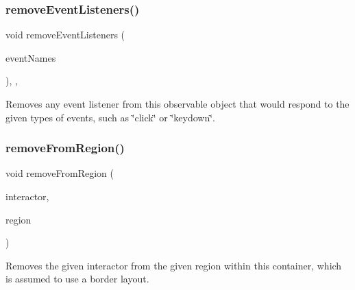 \mbox{\label{classGObservable_af51cc35c29a1bd1908609d432decdbb6}} 
\subsubsection{\texorpdfstring{remove\+Event\+Listeners()}{removeEventListeners()}}
{\footnotesize\ttfamily void remove\+Event\+Listeners (\begin{DoxyParamCaption}\item[{std\+::initializer\+\_\+list$<$ std\+::string $>$}]{event\+Names }\end{DoxyParamCaption})\hspace{0.3cm}{\ttfamily [protected]}, {\ttfamily [virtual]}, {\ttfamily [inherited]}}



Removes any event listener from this observable object that would respond to the given types of events, such as \char`\"{}click\char`\"{} or \char`\"{}keydown\char`\"{}. 

\mbox{\label{classGContainer_a87a74b040025878283ba685e30d5104f}} 
\subsubsection{\texorpdfstring{remove\+From\+Region()}{removeFromRegion()}\hspace{0.1cm}{\footnotesize\ttfamily [1/6]}}
{\footnotesize\ttfamily void remove\+From\+Region (\begin{DoxyParamCaption}\item[{\mbox{\hyperlink{classGInteractor}{G\+Interactor}} $\ast$}]{interactor,  }\item[{\mbox{\hyperlink{classGContainer_a81a01a86de31071a92e6cce0bab9bc4b}{Region}}}]{region }\end{DoxyParamCaption})\hspace{0.3cm}{\ttfamily [virtual]}}



Removes the given interactor from the given region within this container, which is assumed to use a border layout. 

